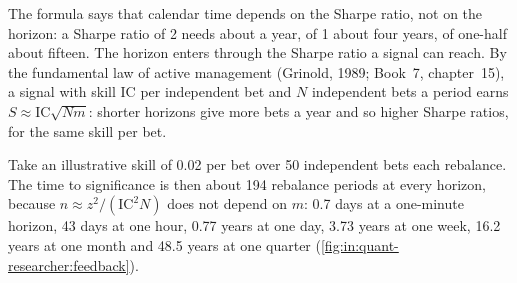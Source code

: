 The formula says that calendar time depends on the Sharpe ratio, not on the horizon: a Sharpe ratio of 2 needs about a
year, of 1 about four years, of one-half about fifteen. The horizon enters through the Sharpe ratio a signal can reach.
By the fundamental law of active management (Grinold, 1989; Book~7, chapter~15), a signal with skill $\mathrm{IC}$ per
independent bet and $N$ independent bets a period earns $S\approx \mathrm{IC}\sqrt{N m}$: shorter horizons give more bets
a year and so higher Sharpe ratios, for the same skill per bet.

\begin{example}\label{ex:in:quant-researcher:law}
Take an illustrative skill of 0.02 per bet over 50 independent bets each rebalance. The time to significance is then about
194 rebalance periods at every horizon, because $n\approx z^2/(\mathrm{IC}^2N)$ does not depend on $m$: 0.7 days at a
one-minute horizon, 43 days at one hour, 0.77 years at one day, 3.73 years at one week, 16.2 years at one month and 48.5
years at one quarter (\cref{fig:in:quant-researcher:feedback}).
\end{example}

\begin{omfigure}

\label{fig:in:quant-researcher:feedback}
\end{omfigure}

